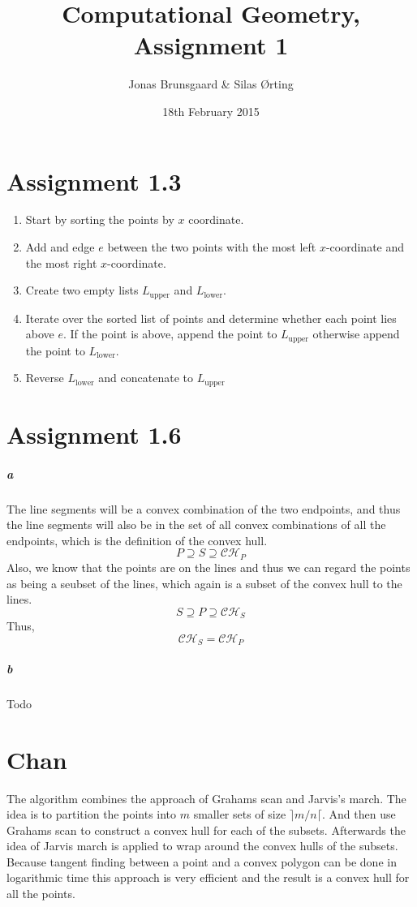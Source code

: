 \documentclass[10pt,a4paper,final,oneside,openany,article]{memoir}
\title{Computational Geometry, Assignment 1}
\author{
    Jonas Brunsgaard \& Silas Ørting
}
\date{18th February 2015}
\begin{document}
\maketitle

\chapter*{Assignment 1.3}
\begin{enumerate}
  \item Start by sorting the points by $x$ coordinate.
  \item Add and edge $e$ between the two points with the most left
    $x$-coordinate and the most right $x$-coordinate.
  \item Create two empty lists $L_{\textrm{upper}}$ and $L_{\textrm{lower}}$.
  \item Iterate over the sorted list of points and determine whether each point
    lies above $e$. If the point is above, append the point to
    $L_{\textrm{upper}}$ otherwise append the point to $L_{\textrm{lower}}$.
  \item Reverse $L_{\textrm{lower}}$ and concatenate to $L_{\textrm{upper}}$
\end{enumerate}

\chapter*{Assignment 1.6}
\paragraph{a} The line segments will be a convex combination of the two
endpoints, and thus the line segments will also be in the set of all convex
combinations of all the endpoints, which is the definition of the convex hull.
$$ P \supseteq S \supseteq \mathcal{CH}_P $$
Also, we know that the points are on the lines and thus we can regard the
points as being a seubset of the lines, which again is a subset of the convex
hull to the lines.
$$ S \supseteq P \supseteq \mathcal{CH}_S $$
Thus,
$$ \mathcal{CH}_S = \mathcal{CH}_P $$
\paragraph{b} Todo 

\chapter*{Chan}
The algorithm combines the approach of Grahams scan and Jarvis’s march. The
idea is to partition the points into $m$ smaller sets of size $\rceil m/n
\lceil$. And then use Grahams scan to construct a convex hull for each of the
subsets. Afterwards the idea of Jarvis march is applied to wrap around the
convex hulls of the subsets. Because tangent finding between a point and a
convex polygon can be done in logarithmic time this approach is very efficient
and the result is a convex hull for all the points.
\end{document}
